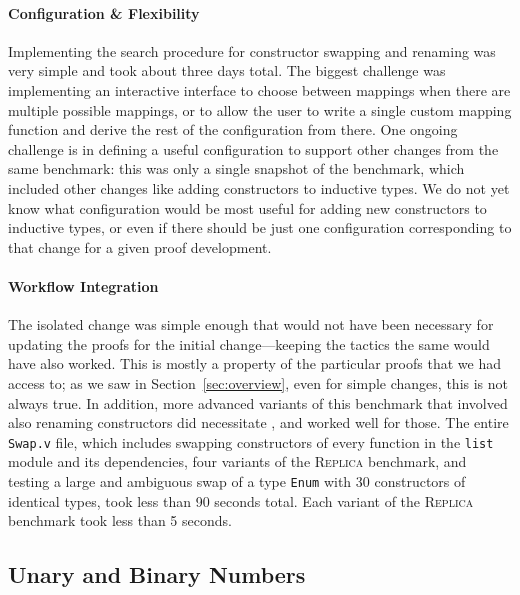 \paragraph{Configuration \& Flexibility}
Implementing the search procedure for constructor swapping and renaming was very simple and took about three days total.
The biggest challenge was implementing an interactive interface to choose between mappings when there are multiple possible mappings,
or to allow the user to write a single custom mapping function and derive the rest of the configuration from there.
One ongoing challenge is in defining a useful configuration to support other changes from the same benchmark:
this was only a single snapshot of the benchmark, which included
other changes like adding constructors to inductive types.
We do not yet know what configuration would be most useful for adding new constructors to inductive types,
or even if there should be just one configuration corresponding to that change for a given proof development.

\paragraph{Workflow Integration}
The isolated change was simple enough that \toolname would not have been necessary
for updating the proofs for the initial change---keeping the tactics the same would have also worked.
This is mostly a property of the particular proofs that we had access to;
as we saw in Section~\ref{sec:overview}, even for simple changes, this is not always true.
In addition, more advanced variants of this benchmark that involved also renaming constructors did necessitate \toolname,
and \toolname worked well for those. %
The entire \lstinline{Swap.v} file, which includes swapping constructors of every function in the \lstinline{list} module and
its dependencies, four variants of the \textsc{Replica} benchmark,
and testing a large and ambiguous swap of a type \lstinline{Enum} with 30 constructors of identical types,
took \toolname less than 90 seconds total. %
Each variant of the \textsc{Replica} benchmark took \toolname less than 5 seconds. %

\subsection{Unary and Binary Numbers}
\label{sec:bin}

